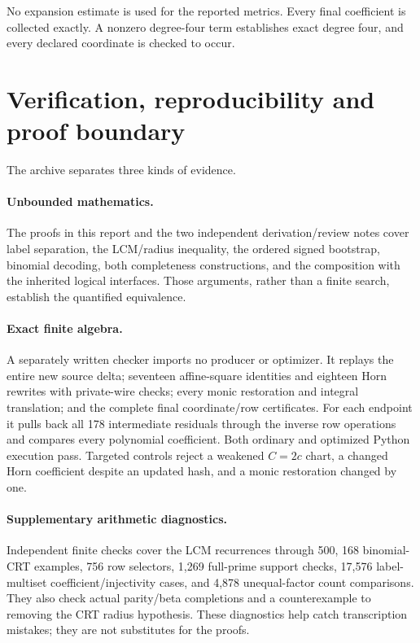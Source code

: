No expansion estimate is used for the reported metrics. Every final
coefficient is collected exactly. A nonzero degree-four term establishes
exact degree four, and every declared coordinate is checked to occur.

\section{Verification, reproducibility and proof boundary}\label{sec:verification}

The archive separates three kinds of evidence.

\paragraph{Unbounded mathematics.}
The proofs in this report and the two independent derivation/review notes
cover label separation, the LCM/radius inequality, the ordered signed
bootstrap, binomial decoding, both completeness constructions, and the
composition with the inherited logical interfaces. Those arguments, rather
than a finite search, establish the quantified equivalence.

\paragraph{Exact finite algebra.}
A separately written checker imports no producer or optimizer. It replays
the entire new source delta; seventeen affine-square identities and eighteen
Horn rewrites with private-wire checks; every monic restoration and integral
translation; and the complete final coordinate/row certificates. For each
endpoint it pulls back all 178 intermediate residuals through the inverse
row operations and compares every polynomial coefficient. Both ordinary
and optimized Python execution pass. Targeted controls reject a weakened
$C=2c$ chart, a changed Horn coefficient despite an updated hash, and a
monic restoration changed by one.

\paragraph{Supplementary arithmetic diagnostics.}
Independent finite checks cover the LCM recurrences through 500, 168
binomial-CRT examples, 756 row selectors, 1,269 full-prime support checks,
17,576 label-multiset coefficient/injectivity cases, and 4,878 unequal-factor
count comparisons. They also check actual parity/beta completions and a
counterexample to removing the CRT radius hypothesis. These diagnostics
help catch transcription mistakes; they are not substitutes for the proofs.

